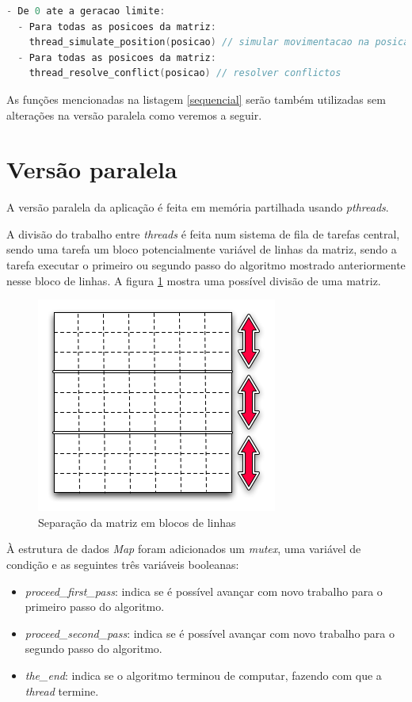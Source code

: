 \documentclass[12pt]{article}
\begin{document}
\begin{lstlisting}[language=c,frame=single,caption={Algoritmo da versão sequencial.},label=sequencial]
- De 0 ate a geracao limite:
  - Para todas as posicoes da matriz:
    thread_simulate_position(posicao) // simular movimentacao na posicao
  - Para todas as posicoes da matriz:
    thread_resolve_conflict(posicao) // resolver conflictos
\end{lstlisting}

As funções mencionadas na listagem \ref{sequencial} serão também utilizadas sem alterações na versão
paralela como veremos a seguir.

\section{Versão paralela}

A versão paralela da aplicação é feita em memória partilhada usando \textit{pthreads}.

A divisão do trabalho entre \textit{threads} é feita num sistema de fila de tarefas central, sendo
uma tarefa um bloco potencialmente variável de linhas da matriz, sendo a tarefa executar o primeiro
ou segundo passo do algoritmo mostrado anteriormente nesse bloco de linhas. A figura \ref{fig:tasks_matriz}
mostra uma possível divisão de uma matriz.

\begin{figure}[ht]
  \centering
    \includegraphics[scale=0.8]{diagrama_pipeline.png}
  \caption{Separação da matriz em blocos de linhas}
  \label{fig:tasks_matriz}
\end{figure}

À estrutura de dados \textit{Map} foram adicionados um \textit{mutex}, uma variável de condição
e as seguintes três variáveis booleanas:

\begin{itemize}
  \item \textit{proceed\_first\_pass}: indica se é possível avançar com novo trabalho
  para o primeiro passo do algoritmo.
  \item \textit{proceed\_second\_pass}: indica se é possível avançar com novo trabalho
  para o segundo passo do algoritmo.
  \item \textit{the\_end}: indica se o algoritmo terminou de computar, fazendo com que a \textit{thread} termine.
\end{itemize}
\end{document}
